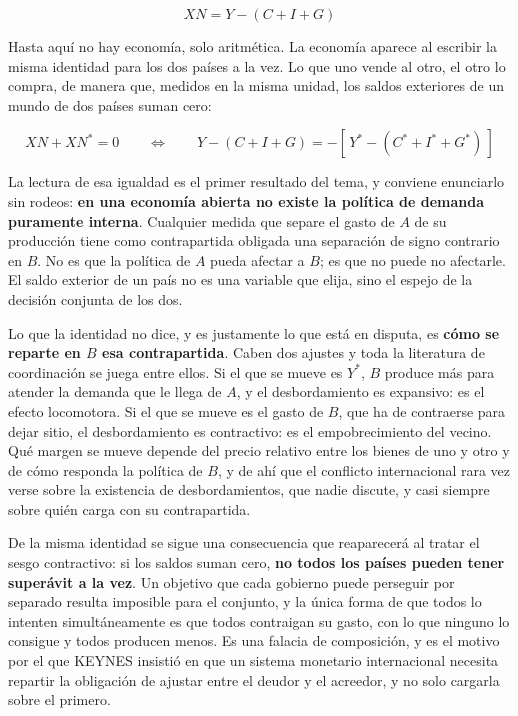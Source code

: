 \documentclass[10pt,a4paper]{article}
\begin{document}
$$XN=Y-(C+I+G)$$

Hasta aquí no hay economía, solo aritmética. La economía aparece al escribir la misma identidad para los dos países a la vez. Lo que uno vende al otro, el otro lo compra, de manera que, medidos en la misma unidad, los saldos exteriores de un mundo de dos países suman cero:

$$XN+XN^{*}=0\qquad\Longleftrightarrow\qquad Y-(C+I+G)=-\left[\,Y^{*}-(C^{*}+I^{*}+G^{*})\,\right]$$

La lectura de esa igualdad es el primer resultado del tema, y conviene enunciarlo sin rodeos: \textbf{en una economía abierta no existe la política de demanda puramente interna}. Cualquier medida que separe el gasto de $A$ de su producción tiene como contrapartida obligada una separación de signo contrario en $B$. No es que la política de $A$ pueda afectar a $B$; es que no puede no afectarle. El saldo exterior de un país no es una variable que elija, sino el espejo de la decisión conjunta de los dos.

Lo que la identidad no dice, y es justamente lo que está en disputa, es \textbf{cómo se reparte en $B$ esa contrapartida}. Caben dos ajustes y toda la literatura de coordinación se juega entre ellos. Si el que se mueve es $Y^{*}$, $B$ produce más para atender la demanda que le llega de $A$, y el desbordamiento es expansivo: es el efecto locomotora. Si el que se mueve es el gasto de $B$, que ha de contraerse para dejar sitio, el desbordamiento es contractivo: es el empobrecimiento del vecino. Qué margen se mueve depende del precio relativo entre los bienes de uno y otro y de cómo responda la política de $B$, y de ahí que el conflicto internacional rara vez verse sobre la existencia de desbordamientos, que nadie discute, y casi siempre sobre quién carga con su contrapartida.

De la misma identidad se sigue una consecuencia que reaparecerá al tratar el sesgo contractivo: si los saldos suman cero, \textbf{no todos los países pueden tener superávit a la vez}. Un objetivo que cada gobierno puede perseguir por separado resulta imposible para el conjunto, y la única forma de que todos lo intenten simultáneamente es que todos contraigan su gasto, con lo que ninguno lo consigue y todos producen menos. Es una falacia de composición, y es el motivo por el que KEYNES insistió en que un sistema monetario internacional necesita repartir la obligación de ajustar entre el deudor y el acreedor, y no solo cargarla sobre el primero.
\end{document}
